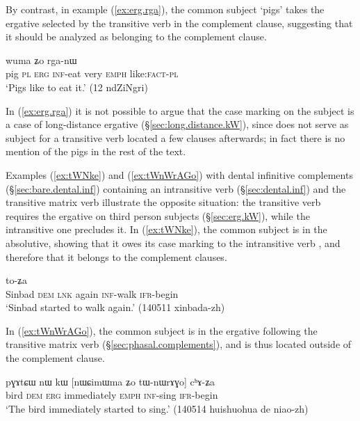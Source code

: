 By contrast, in example (\ref{ex:erg.rga}), the common subject   `pigs' takes the ergative  selected by the transitive verb   in the complement clause, suggesting that it should be analyzed as belonging to the complement clause.

\begin{exe}
\ex \label{ex:erg.rga}
 wuma ʑo rga-nɯ \\
pig \textsc{pl} \textsc{erg} \textsc{inf}-eat very \textsc{emph}  like:\textsc{fact}-\textsc{pl} \\
 \glt `Pigs like to eat it.' (12 ndZiNgri)
\end{exe}

In (\ref{ex:erg.rga}) it is not possible to argue that the case marking on the subject is a case of long-distance ergative (§\ref{sec:long.distance.kW}), since   does not serve as subject for a transitive verb located a few clauses afterwards; in fact there is no mention of the pigs in the rest of the text.


Examples (\ref{ex:tWNke}) and (\ref{ex:tWnWrAGo}) with dental infinitive complements (§\ref{sec:bare.dental.inf}) containing an intransitive verb (§\ref{sec:dental.inf}) and the transitive matrix verb  illustrate the opposite situation: the transitive verb requires the ergative on third person subjects (§\ref{sec:erg.kW}), while the intransitive one precludes it. In (\ref{ex:tWNke}), the common subject is in the absolutive, showing that it owes its case marking to the intransitive verb , and therefore that it belongs to the complement clauses.

\begin{exe}
\ex \label{ex:tWNke}
 to-ʑa \\
Sinbad \textsc{dem} \textsc{lnk} again  \textsc{inf}-walk \textsc{ifr}-begin \\
\glt `Sinbad started to walk again.' (140511 xinbada-zh)
\end{exe}

In (\ref{ex:tWnWrAGo}), the common subject is in the ergative following the transitive matrix verb  (§\ref{sec:phasal.complements}), and is thus located outside of the complement clause.

\begin{exe}
\ex \label{ex:tWnWrAGo}
\gll pɣɤtɕɯ nɯ kɯ [nɯɕimɯma ʑo tɯ-nɯrɤɣo] cʰɤ-ʑa \\
bird \textsc{dem} \textsc{erg} immediately \textsc{emph} \textsc{inf}-sing \textsc{ifr}-begin \\
\glt `The bird immediately started to sing.' (140514 huishuohua de niao-zh)
\end{exe}


